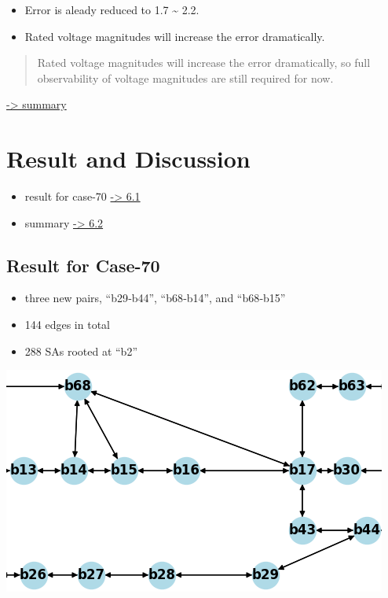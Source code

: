 \documentclass[
]{book}
\providecommand{\tightlist}{%
  \setlength{\itemsep}{0pt}\setlength{\parskip}{0pt}}
\begin{document}
\begin{itemize}
\tightlist
\item
  Error is aleady reduced to 1.7 \textasciitilde{} 2.2.
\item
  Rated voltage magnitudes will increase the error dramatically.
\end{itemize}

\begin{quote}
Rated voltage magnitudes will increase the error dramatically, so full
observability of voltage magnitudes are still required for now.
\end{quote}

\protect\hyperlink{summary}{-\textgreater{} summary}

\hypertarget{result-and-discussion}{%
\chapter{Result and Discussion}\label{result-and-discussion}}

\begin{itemize}
\tightlist
\item
  result for case-70 \protect\hyperlink{result}{-\textgreater{} 6.1}
\item
  summary \protect\hyperlink{summary}{-\textgreater{} 6.2}
\end{itemize}

\hypertarget{result}{%
\section{Result for Case-70}\label{result}}

\begin{itemize}
\tightlist
\item
  three new pairs, ``b29‐b44'', ``b68‐b14'', and ``b68‐b15''
\item
  144 edges in total
\item
  288 SAs rooted at ``b2''
\end{itemize}

\begin{center}\includegraphics[width=0.55\linewidth]{Pictures/case70} \end{center}
\end{document}
